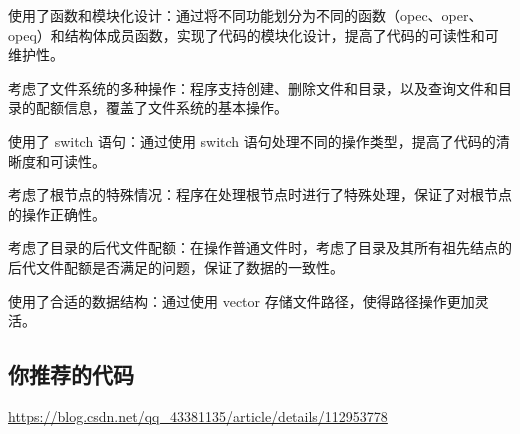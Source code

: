 使用了函数和模块化设计：通过将不同功能划分为不同的函数（opec、oper、opeq）和结构体成员函数，实现了代码的模块化设计，提高了代码的可读性和可维护性。

考虑了文件系统的多种操作：程序支持创建、删除文件和目录，以及查询文件和目录的配额信息，覆盖了文件系统的基本操作。

使用了 switch 语句：通过使用 switch 语句处理不同的操作类型，提高了代码的清晰度和可读性。

考虑了根节点的特殊情况：程序在处理根节点时进行了特殊处理，保证了对根节点的操作正确性。

考虑了目录的后代文件配额：在操作普通文件时，考虑了目录及其所有祖先结点的后代文件配额是否满足的问题，保证了数据的一致性。

使用了合适的数据结构：通过使用 vector 存储文件路径，使得路径操作更加灵活。

\subsection{你推荐的代码}

\href{202012-3 带配额的文件系统}{https://blog.csdn.net/qq\_43381135/article/details/112953778}

